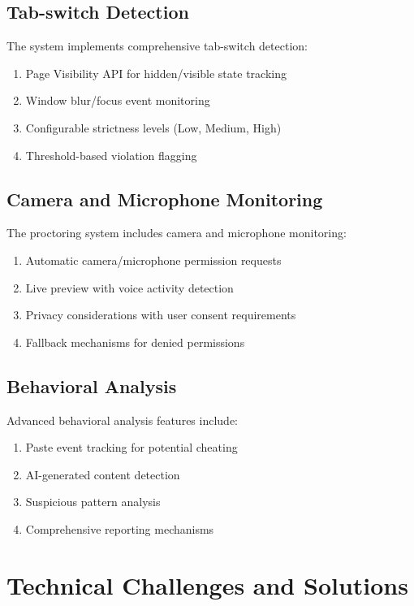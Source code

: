 \documentclass[12pt, conference]{IEEEtran}
\begin{document}
\subsection{Tab-switch Detection}

The system implements comprehensive tab-switch detection:
\begin{enumerate}
    \item Page Visibility API for hidden/visible state tracking
    \item Window blur/focus event monitoring
    \item Configurable strictness levels (Low, Medium, High)
    \item Threshold-based violation flagging
\end{enumerate}

\subsection{Camera and Microphone Monitoring}

The proctoring system includes camera and microphone monitoring:
\begin{enumerate}
    \item Automatic camera/microphone permission requests
    \item Live preview with voice activity detection
    \item Privacy considerations with user consent requirements
    \item Fallback mechanisms for denied permissions
\end{enumerate}

\subsection{Behavioral Analysis}

Advanced behavioral analysis features include:
\begin{enumerate}
    \item Paste event tracking for potential cheating
    \item AI-generated content detection
    \item Suspicious pattern analysis
    \item Comprehensive reporting mechanisms
\end{enumerate}

\section{Technical Challenges and Solutions}
\end{document}
